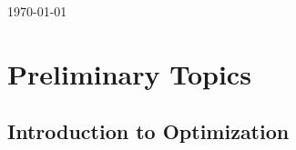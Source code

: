 

	\maketitle
	\today

	\clearpage
	\thispagestyle{plain}
	\par{}

	\tableofcontents


	\part{Preliminary Topics}\label{PT}
		\chapter{Introduction to Optimization}
